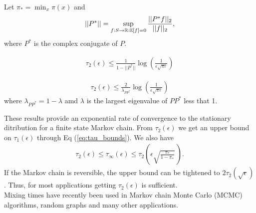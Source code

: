 \documentclass[all-lectures.tex]{subfiles}
\begin{document}
Let $\pi_* = \min_x \pi(x)$ and
\begin{align*}
||P^*|| = \sup_{f:S\to \mathbb{R}: \mathbb{E}[f] =0} \frac{||P^*f||_2}{||f||_2},
\end{align*}
where $P^*$ is the complex conjugate of $P$. 
\begin{prop}
\begin{align*}
\tau_2(\epsilon) \leq \frac{1}{1-||P^*||} \log\left(\frac{1}{\epsilon \sqrt{\pi_*}}\right)
\end{align*}
\end{prop}
\begin{prop}
\begin{align*}
\tau_2(\epsilon) \leq \frac{2}{\lambda_{PP^*}} \log\left( \frac{1}{\epsilon \sqrt{\pi_*}}\right) 
\end{align*}
where $\lambda_{PP^*} = 1-\lambda$ amd $\lambda$ is the largest eigenvalue of $PP^*$ less that 1.
\end{prop}
These results provide an exponential rate of convergence to the stationary ditribution for a finite state Markov chain. From $\tau_2(\epsilon)$ we get an upper bound on $\tau_1(\epsilon)$ through Eq (\ref{eq:tau_bounds}). We also have
\begin{align*}
\tau_2(\epsilon) \leq \tau_\infty (\epsilon) \leq \tau_2\left(\epsilon \sqrt{\frac{\pi_*}{1-\pi_*}}\,\right).
\end{align*}
If the Markov chain is reversible, the upper bound can be tightened to $2\tau_2(\sqrt{\epsilon})$. Thus, for most applications getting $\tau_2(\epsilon)$ is sufficient.  \\
\indent Mixing times have recently been used in Markov chain Monte Carlo (MCMC) algorithms, random graphs and many other applications.
\end{document}

